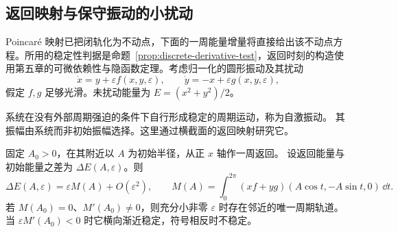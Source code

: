 \subsection*{返回映射与保守振动的小扰动}
\label{sec:perturbed-oscillation}
Poincar\'e 映射已把闭轨化为不动点，下面的一周能量增量将直接给出该不动点方程。所用的稳定性判据是命题~\ref{prop:discrete-derivative-test}，返回时刻的构造使用第五章的可微依赖性与隐函数定理。考虑归一化的圆形振动及其扰动
\[
 \dot x=y+\varepsilon f(x,y,\varepsilon),\qquad
 \dot y=-x+\varepsilon g(x,y,\varepsilon),
\]
假定 $f,g$ 足够光滑。未扰动能量为 $E=(x^2+y^2)/2$。
\begin{definition}
系统在没有外部周期强迫的条件下自行形成稳定的周期运动，称为自激振动。
其振幅由系统而非初始振幅选择。这里通过横截面的返回映射研究它。
\end{definition}
\begin{theorem}[一周能量增量]
固定 $A_0>0$，在其附近以 $A$ 为初始半径，从正 $x$ 轴作一周返回。
设返回能量与初始能量之差为 $\Delta E(A,\varepsilon)$。则
\[
 \Delta E(A,\varepsilon)=\varepsilon M(A)+O(\varepsilon^2),\qquad
 M(A)=\int_0^{2\pi}(xf+yg)(A\cos t,-A\sin t,0)\,\dd t.
\]
若 $M(A_0)=0$、$M'(A_0)\ne0$，则充分小非零 $\varepsilon$ 时存在邻近的唯一周期轨道。
当 $\varepsilon M'(A_0)<0$ 时它横向渐近稳定，符号相反时不稳定。
\end{theorem}
